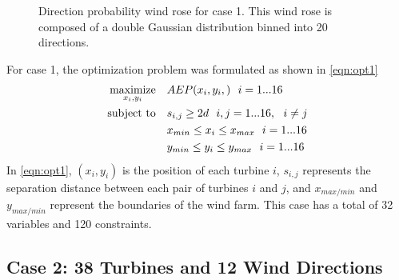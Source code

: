 \documentclass{jpconf}
\begin{document}
\begin{figure}[h!]
\begin{minipage}[t]{18pc}
\caption{Direction probability wind rose for case 1. This wind rose is composed of a double Gaussian distribution binned into 20 directions.}
\label{fig:directional}
\end{minipage} 
\end{figure}
%

For case 1, the optimization problem was formulated as shown in \cref{eqn:opt1}
%
\begin{equation}
	\label{eqn:opt1}
	\begin{aligned} [b]
	\underset{x_i,y_i}{\textrm{maximize}} \quad & AEP(x_i,y_i,)~~i=1...16\\
	\textrm{subject to} \quad & s_{i,j} \geq 2\*d~~i,j=1...16,~~i \neq j\\
	 & x_{min} \leq x_i \leq x_{max}~~i=1...16\\
     & y_{min} \leq y_i \leq y_{max}~~i=1...16
	\end{aligned}
\end{equation}
%
%
In \cref{eqn:opt1}, $(x_i,y_i)$ is the position of each turbine $i$, $s_{i,j}$ represents the separation distance between each pair of turbines $i$ and $j$, and $x_{max/min}$ and $y_{max/min}$ represent the boundaries of the wind farm. This case has a total of 32 variables and 120 constraints.

\subsection{Case 2: 38 Turbines and 12 Wind Directions}\label{sec:case2}
\end{document}
